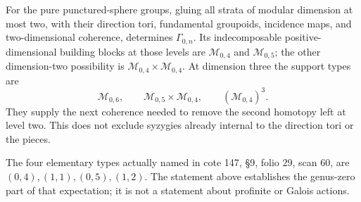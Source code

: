 \begin{theorem}\label{P5c4}
For the pure punctured-sphere groups, gluing all strata of
modular dimension at most two, with their direction tori,
fundamental groupoids, incidence maps, and two-dimensional
coherence, determines $\Gamma_{0,n}$.  Its indecomposable
positive-dimensional building blocks at those levels are
$\mathcal M_{0,4}$ and $\mathcal M_{0,5}$; the other
dimension-two possibility is
$\mathcal M_{0,4}\times\mathcal M_{0,4}$.
At dimension three the support types are
\[
 \mathcal M_{0,6},\qquad
 \mathcal M_{0,5}\times\mathcal M_{0,4},\qquad
 (\mathcal M_{0,4})^3.
\]
They supply the next coherence needed to remove the second
homotopy left at level two.  This does not exclude syzygies
already internal to the direction tori or the pieces.

The four elementary types actually named in cote 147,
\S9, folio 29, scan 60, are
$(0,4),(1,1),(0,5),(1,2)$.  The statement above establishes
the genus-zero part of that expectation; it is not a statement
about profinite or Galois actions.
\end{theorem}
